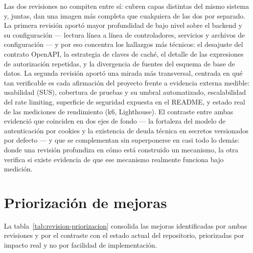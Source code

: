 Las dos revisiones no compiten entre s\'i: cubren capas distintas del mismo
sistema y, juntas, dan una imagen m\'as completa que cualquiera de las dos
por separado. La primera revisi\'on aport\'o mayor profundidad de bajo nivel
sobre el backend y su configuraci\'on --- lectura l\'inea a l\'inea de
controladores, servicios y archivos de configuraci\'on --- y por eso
concentra los hallazgos m\'as t\'ecnicos: el desajuste del contrato OpenAPI,
la estrategia de claves de cach\'e, el detalle de las expresiones de
autorizaci\'on repetidas, y la divergencia de fuentes del esquema de base de
datos. La segunda revisi\'on aport\'o una mirada m\'as transversal, centrada
en qu\'e tan verificable es cada afirmaci\'on del proyecto frente a
evidencia externa medible: usabilidad (SUS), cobertura de pruebas y su
umbral automatizado, escalabilidad del rate limiting, superficie de
seguridad expuesta en el README, y estado real de las mediciones de
rendimiento (k6, Lighthouse). El contraste entre ambas evidenci\'o que
coinciden en dos ejes de fondo --- la fortaleza del modelo de autenticaci\'on
por cookies y la existencia de deuda t\'ecnica en secretos versionados por
defecto --- y que se complementan sin superponerse en casi todo lo dem\'as:
donde una revisi\'on profundiza en c\'omo est\'a construido un mecanismo, la
otra verifica si existe evidencia de que ese mecanismo realmente funciona
bajo medici\'on.

\section{Priorizaci\'on de mejoras}
\label{sec:revision-priorizacion}

La tabla~\ref{tab:revision-priorizacion} consolida las mejoras identificadas
por ambas revisiones y por el contraste con el estado actual del
repositorio, priorizadas por impacto real y no por facilidad de
implementaci\'on.

